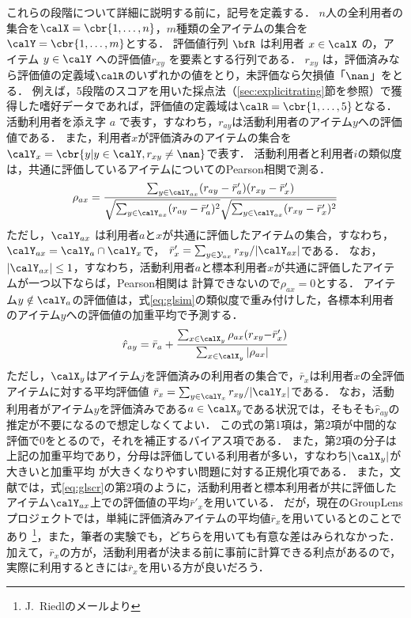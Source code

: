 これらの段階について詳細に説明する前に，記号を定義する．
$n$人の全利用者の集合を$\calX=\cbr{1,\dotsc,n}$，$m$種類の全アイテムの集合を$\calY=\cbr{1,\dotsc,m}$とする．
評価値行列 $\bfR$ は利用者 $x\in\calX$ の，アイテム $y\in \calY$ への評価値$r_{xy}$ を要素とする行列である．
$r_{xy}$ は，評価済みなら評価値の定義域$\calR$のいずれかの値をとり，未評価なら欠損値「$\nan$」をとる．
例えば，5段階のスコアを用いた採点法（\ref{sec:explicitrating}節を参照）で獲得した嗜好データであれば，評価値の定義域は$\calR=\cbr{1,\dotsc,5}$となる．
活動利用者を添え字 $a$ で表す，すなわち，$r_{ay}$は活動利用者のアイテム$y$への評価値である．
また，利用者$x$が評価済みのアイテムの集合を$\calY_x=\cbr{y| y\in\calY, r_{xy}\ne\nan}$で表す．
活動利用者と利用者$i$の類似度は，共通に評価しているアイテムについてのPearson相関で測る．
\begin{equation}
\rho_{ax}=
\frac{\sum_{y\in\calY_{ax}}(r_{ay}-\bar{r}'_a)(r_{xy}-\bar{r}'_x)}%
{\sqrt{\sum_{y\in\calY_{ax}}(r_{ay}-\bar{r}'_a)^2}\sqrt{\sum_{y\in\calY_{ax}}(r_{xy}-\bar{r}'_x)^2}}
\label{eq:glsim}
\end{equation}
ただし，$\calY_{ax}$ は利用者$a$と$x$が共通に評価したアイテムの集合，すなわち，$\calY_{ax}=\calY_a\cap \calY_x$で，
${\bar{r}'}_x=\sum_{y\in \mathcal{Y}_{ax}}r_{xy}/|\calY_{ax}|$である．
なお，$|\calY_{ax}|\le1$，すなわち，活動利用者$a$と標本利用者$x$が共通に評価したアイテムが一つ以下ならば，Pearson相関は
計算できないので$\rho_{ax}=0$とする．
アイテム$y\notin\calY_a$の評価値は，式\eqref{eq:glsim}の類似度で重み付けした，各標本利用者のアイテム$y$への評価値の加重平均で予測する．
\begin{equation}
\hat{r}_{ay}=
\bar{r}_a+\frac{\sum_{x\in\calX_{y}}\rho_{ax}(r_{xy}{-}\bar{r}'_x)}{\sum_{x\in\calX_{y}}|\rho_{ax}|}
\label{eq:glscr}
\end{equation}
ただし，$\calX_y$はアイテム$j$を評価済みの利用者の集合で，$\bar{r}_{x}$は利用者$x$の全評価アイテムに対する平均評価値 $\bar{r}_x=\sum_{y\in\calY_x}r_{xy}/|\calY_x|$である．
なお，活動利用者がアイテム$y$を評価済みである$a\in\calX_y$である状況では，そもそも$\hat{r}_{ay}$の推定が不要になるので想定しなくてよい．
この式の第1項は，第2項が中間的な評価で0をとるので，それを補正するバイアス項である．
また，第2項の分子は上記の加重平均であり，分母は評価している利用者が多い，すなわち$|\calX_y|$が大きいと加重平均
が大きくなりやすい問題に対する正規化項である．
また，文献\cite{cscw:94:01}では，式\eqref{eq:glscr}の第2項のように，活動利用者と標本利用者が共に評価したアイテム$\calY_{ax}$上での評価値の平均$\bar{r}'_x$を用いている．
だが，現在のGroupLensプロジェクトでは，単純に評価済みアイテムの平均値$\bar{r}_x$を用いているとのことであり%
\footnote{J.~Riedlのメールより}，また，筆者の実験でも，どちらを用いても有意な差はみられなかった．
加えて，$\bar{r}_x$の方が，活動利用者が決まる前に事前に計算できる利点があるので，実際に利用するときには$\bar{r}_x$を用いる方が良いだろう．

